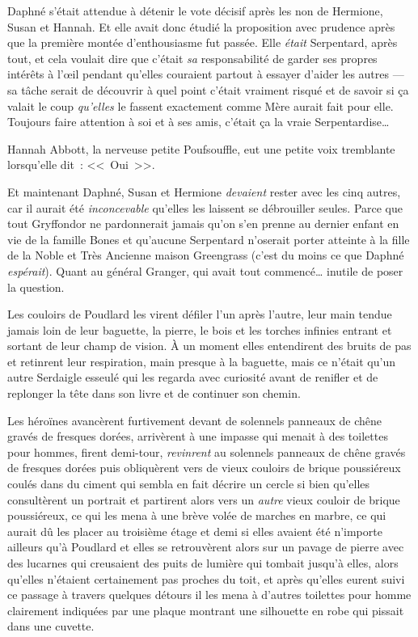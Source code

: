 Daphné s'était attendue à détenir le vote décisif après les non de Hermione, Susan et Hannah. Et elle avait donc étudié la proposition avec prudence après que la première montée d'enthousiasme fut passée. Elle \emph{était} Serpentard, après tout, et cela voulait dire que c'était \emph{sa} responsabilité de garder ses propres intérêts à l'œil pendant qu'elles couraient partout à essayer d'aider les autres — sa tâche serait de découvrir à quel point c'était vraiment risqué et de savoir si ça valait le coup \emph{qu'elles} le fassent exactement comme Mère aurait fait pour elle. Toujours faire attention à soi et à ses amis, c'était ça la vraie Serpentardise…

Hannah Abbott, la nerveuse petite Poufsouffle, eut une petite voix tremblante lorsqu'elle dit~: <<~Oui~>>.

Et maintenant Daphné, Susan et Hermione \emph{devaient} rester avec les cinq autres, car il aurait été \emph{inconcevable} qu'elles les laissent se débrouiller seules. Parce que tout Gryffondor ne pardonnerait jamais qu'on s'en prenne au dernier enfant en vie de la famille Bones et qu'aucune Serpentard n'oserait porter atteinte à la fille de la Noble et Très Ancienne maison Greengrass (c'est du moins ce que Daphné \emph{espérait}). Quant au général Granger, qui avait tout commencé… inutile de poser la question.

Les couloirs de Poudlard les virent défiler l'un après l'autre, leur main tendue jamais loin de leur baguette, la pierre, le bois et les torches infinies entrant et sortant de leur champ de vision. À un moment elles entendirent des bruits de pas et retinrent leur respiration, main presque à la baguette, mais ce n'était qu'un autre Serdaigle esseulé qui les regarda avec curiosité avant de renifler et de replonger la tête dans son livre et de continuer son chemin.

Les héroïnes avancèrent furtivement devant de solennels panneaux de chêne gravés de fresques dorées, arrivèrent à une impasse qui menait à des toilettes pour hommes, firent demi-tour, \emph{revinrent} au solennels panneaux de chêne gravés de fresques dorées puis obliquèrent vers de vieux couloirs de brique poussiéreux coulés dans du ciment qui sembla en fait décrire un cercle si bien qu'elles consultèrent un portrait et partirent alors vers un \emph{autre} vieux couloir de brique poussiéreux, ce qui les mena à une brève volée de marches en marbre, ce qui aurait dû les placer au troisième étage et demi si elles avaient été n'importe ailleurs qu'à Poudlard et elles se retrouvèrent alors sur un pavage de pierre avec des lucarnes qui creusaient des puits de lumière qui tombait jusqu'à elles, alors qu'elles n'étaient certainement pas proches du toit, et après qu'elles eurent suivi ce passage à travers quelques détours il les mena à d'autres toilettes pour homme clairement indiquées par une plaque montrant une silhouette en robe qui pissait dans une cuvette.

